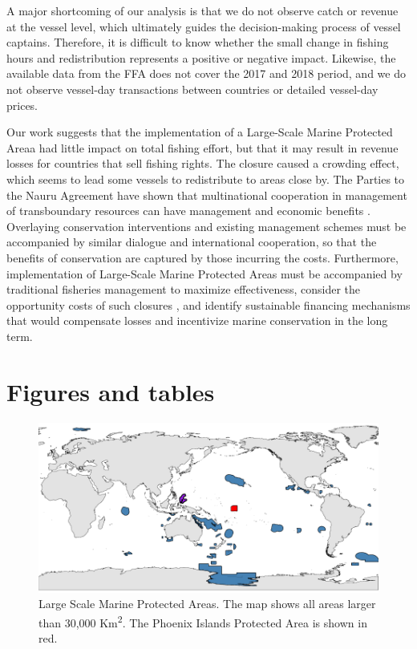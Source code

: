 \documentclass[12pt]{article}
\begin{document}
A major shortcoming of our analysis is that we do not observe catch or revenue at the vessel level, which ultimately guides the decision-making process of vessel captains. Therefore, it is difficult to know whether the small change in fishing hours and redistribution represents a positive or negative impact. Likewise, the available data from the FFA does not cover the 2017 and 2018 period, and we do not observe vessel-day transactions between countries or detailed vessel-day prices.

Our work suggests that the implementation of a Large-Scale Marine Protected Areaa had little impact on total fishing effort, but that it may result in revenue losses for countries that sell fishing rights. The closure caused a crowding effect, which seems to lead some vessels to redistribute to areas close by. The Parties to the Nauru Agreement have shown that multinational cooperation in management of transboundary resources can have management and economic benefits \cite{havice_2013,aqorau_2018}. Overlaying conservation interventions and existing management schemes must be accompanied by similar dialogue and international cooperation, so that the benefits of conservation are captured by those incurring the costs. Furthermore, implementation of Large-Scale Marine Protected Areas must be accompanied by traditional fisheries management to maximize effectiveness, consider the opportunity costs of such closures \cite{smith_2010}, and identify sustainable financing mechanisms \cite{mallin_2019} that would compensate losses and incentivize marine conservation in the long term.





\clearpage

\FloatBarrier

\section{Figures and tables}

\begin{figure}[htbp]
\centering
\includegraphics{img/LSMPAs_map.pdf}
\caption{\label{fig:LSMPAs_map}Large Scale Marine Protected Areas. The map shows all areas larger than 30,000 Km\textsuperscript{2}. The Phoenix Islands Protected Area is shown in red.}
\end{figure}
\end{document}
